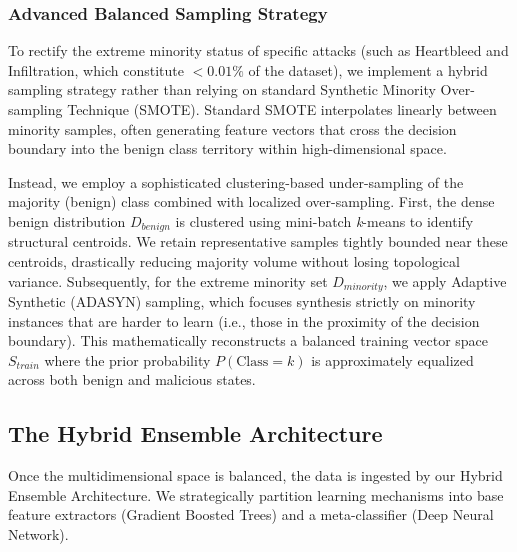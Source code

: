 \subsubsection{Advanced Balanced Sampling Strategy}
To rectify the extreme minority status of specific attacks (such as Heartbleed and Infiltration, which constitute $<0.01\%$ of the dataset), we implement a hybrid sampling strategy rather than relying on standard Synthetic Minority Over-sampling Technique (SMOTE). Standard SMOTE interpolates linearly between minority samples, often generating feature vectors that cross the decision boundary into the benign class territory within high-dimensional space.

Instead, we employ a sophisticated clustering-based under-sampling of the majority (benign) class combined with localized over-sampling. First, the dense benign distribution $D_{benign}$ is clustered using mini-batch \textit{k}-means to identify structural centroids. We retain representative samples tightly bounded near these centroids, drastically reducing majority volume without losing topological variance. Subsequently, for the extreme minority set $D_{minority}$, we apply Adaptive Synthetic (ADASYN) sampling, which focuses synthesis strictly on minority instances that are harder to learn (i.e., those in the proximity of the decision boundary). This mathematically reconstructs a balanced training vector space $S_{train}$ where the prior probability $P(\text{Class} = k)$ is approximately equalized across both benign and malicious states.

\subsection{The Hybrid Ensemble Architecture}
Once the multidimensional space is balanced, the data is ingested by our Hybrid Ensemble Architecture. We strategically partition learning mechanisms into base feature extractors (Gradient Boosted Trees) and a meta-classifier (Deep Neural Network).

